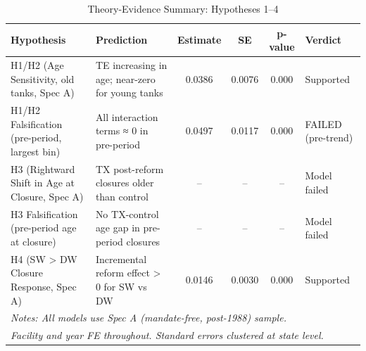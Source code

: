 \begin{table}[htbp]
\centering
\caption{Theory-Evidence Summary: Hypotheses 1--4}
\label{tbl:theory-evidence}
\begin{tabular}{lp{4.5cm}cccl}
\toprule
\textbf{Hypothesis} & \textbf{Prediction} & \textbf{Estimate} & \textbf{SE} & \textbf{p-value} & \textbf{Verdict} \\
\midrule
H1/H2 (Age Sensitivity, old tanks, Spec A) & TE increasing in age; near-zero for young tanks & 0.0386 & 0.0076 & 0.000 & Supported \\
H1/H2 Falsification (pre-period, largest bin) & All interaction terms ≈ 0 in pre-period & 0.0497 & 0.0117 & 0.000 & FAILED (pre-trend) \\
H3 (Rightward Shift in Age at Closure, Spec A) & TX post-reform closures older than control & -- & -- & -- & Model failed \\
H3 Falsification (pre-period age at closure) & No TX-control age gap in pre-period closures & -- & -- & -- & Model failed \\
H4 (SW > DW Closure Response, Spec A) & Incremental reform effect > 0 for SW vs DW & 0.0146 & 0.0030 & 0.000 & Supported \\
\midrule
\multicolumn{6}{l}{\textit{Notes: All models use Spec A (mandate-free, post-1988) sample.}} \\
\multicolumn{6}{l}{\textit{Facility and year FE throughout. Standard errors clustered at state level.}} \\
\bottomrule
\end{tabular}
\end{table}
